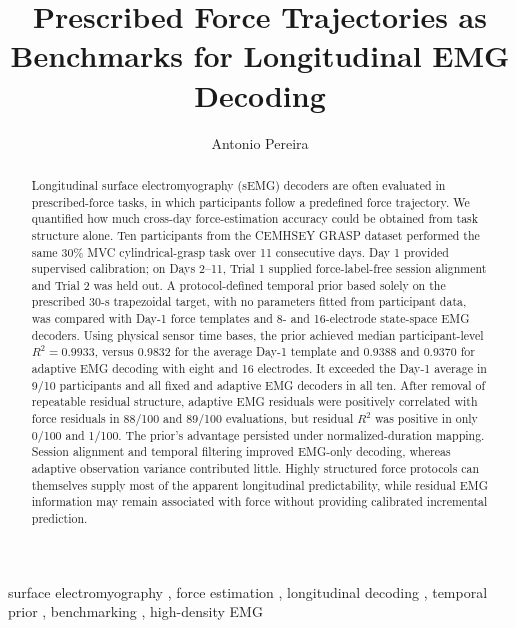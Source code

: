 \documentclass[preprint,12pt]{elsarticle}
\begin{document}
\begin{frontmatter}

\title{Prescribed Force Trajectories as Benchmarks for Longitudinal EMG Decoding}

\author[ufpa]{Antonio Pereira}

\begin{abstract}
Longitudinal surface electromyography (sEMG) decoders are often evaluated in prescribed-force tasks, in which participants follow a predefined force trajectory. We quantified how much cross-day force-estimation accuracy could be obtained from task structure alone. Ten participants from the CEMHSEY GRASP dataset performed the same 30\% MVC cylindrical-grasp task over 11 consecutive days. Day 1 provided supervised calibration; on Days 2--11, Trial 1 supplied force-label-free session alignment and Trial 2 was held out. A protocol-defined temporal prior based solely on the prescribed 30-s trapezoidal target, with no parameters fitted from participant data, was compared with Day-1 force templates and 8- and 16-electrode state-space EMG decoders. Using physical sensor time bases, the prior achieved median participant-level $R^2=0.9933$, versus 0.9832 for the average Day-1 template and 0.9388 and 0.9370 for adaptive EMG decoding with eight and 16 electrodes. It exceeded the Day-1 average in 9/10 participants and all fixed and adaptive EMG decoders in all ten. After removal of repeatable residual structure, adaptive EMG residuals were positively correlated with force residuals in 88/100 and 89/100 evaluations, but residual $R^2$ was positive in only 0/100 and 1/100. The prior's advantage persisted under normalized-duration mapping. Session alignment and temporal filtering improved EMG-only decoding, whereas adaptive observation variance contributed little. Highly structured force protocols can themselves supply most of the apparent longitudinal predictability, while residual EMG information may remain associated with force without providing calibrated incremental prediction.
\end{abstract}

\begin{keyword}
surface electromyography \sep
force estimation \sep
longitudinal decoding \sep
temporal prior \sep
benchmarking \sep
high-density EMG
\end{keyword}

\end{frontmatter}
\end{document}
